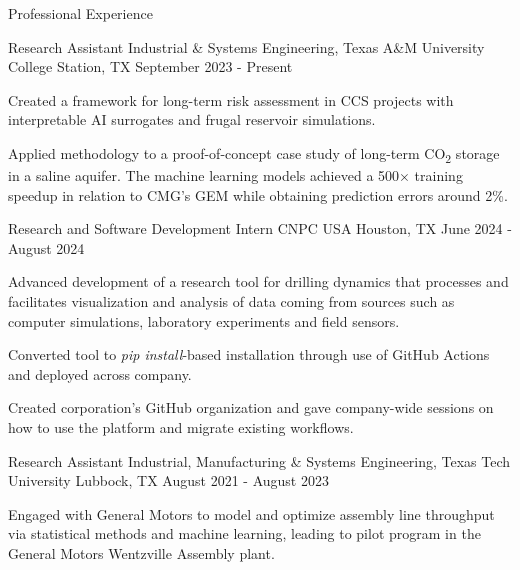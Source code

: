 \begin{cvcontentsection}{Professional Experience}

\begin{cvjob}
    {Research Assistant}
    {Industrial \& Systems Engineering, Texas A\&M University}
    {College Station, TX}
    {September 2023 - Present}
    \item Created a framework for long-term risk assessment in CCS projects with interpretable AI surrogates and frugal reservoir simulations.
    \item Applied methodology to a proof-of-concept case study of long-term CO\textsubscript{2} storage in a saline aquifer.
    The machine learning models achieved a 500\( \times \) training speedup in relation to CMG's GEM while obtaining prediction errors around 2\%.
\end{cvjob}

\begin{cvjob}
    {Research and Software Development Intern}
    {CNPC USA}
    {Houston, TX}
    {June 2024 - August 2024}
    \item Advanced development of a research tool for drilling dynamics that processes and facilitates visualization and analysis of data coming from sources such as computer simulations, laboratory experiments and field sensors.
    \item Converted tool to \textit{pip install}-based installation through use of GitHub Actions and deployed across company.
    \item Created corporation's GitHub organization and gave company-wide sessions on how to use the platform and migrate existing workflows.
\end{cvjob}

\begin{cvjob}
    {Research Assistant}
    {Industrial, Manufacturing \& Systems Engineering, Texas Tech University}
    {Lubbock, TX}
    {August 2021 - August 2023}
    \item Engaged with General Motors to model and optimize assembly line throughput via statistical methods and machine learning, leading to pilot program in the General Motors Wentzville Assembly plant.
\end{cvjob}


\end{cvcontentsection}
